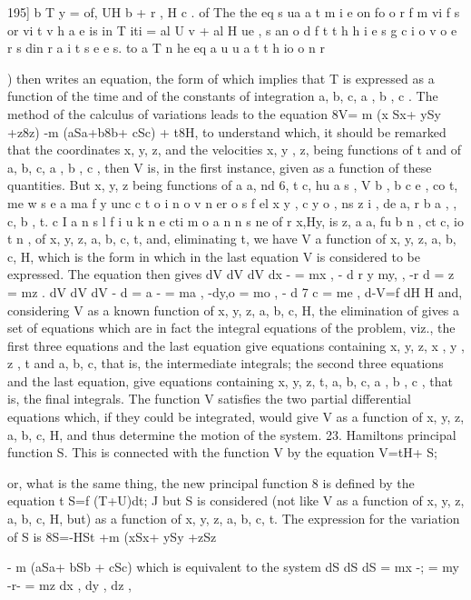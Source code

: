 \documentclass[11pt,a4paper]{book}
\begin{document}

195]
b T y = of, UH b + r , H c . of The the eq s ua a t m i e on fo o r f m vi f s or vi t v h a e is in T iti = al U v + al H ue , s an o d f t t h h i e s g c i o v o e r s din r a i t s e e s. to a T n he eq a u u a t t h io o n r
{)
then writes
an equation, the form of which implies that T is expressed as a function of the time
and of the constants of integration a, b, c, a , b , c . The method of the calculus of
variations leads to the equation
8V= m
(x
Sx+
ySy
+z8z) -m (aSa+b8b+
cSc)
+
t8H,
to understand which, it should be remarked that the coordinates x, y, z, and the
velocities x, y , z, being functions of t and of a, b, c, a , b , c , then V is, in the
first instance, given as a function of these quantities. But x, y, z being functions of
a a, nd 6, t c, hu a s , V b , b c e , co t, me w s e a ma f y unc c t o i n o v n er o s f el x y , c y o , ns z i , de a, r b a , , c, b , t. c I a n s l f i u k n e cti m o a n n s ne of r x,Hy, is z, a a, fu b n , ct c, io t n ,
of x, y, z, a, b, c, t, and, eliminating t, we have V a function of x, y, z, a, b, c, H, which
is the form in which in the last equation V is considered to be expressed. The equation
then gives
dV dV dV
dx - = mx , - d r y my, , -r d = z = mz .
dV dV dV
- d = a - = ma , -dy,o = mo , - d 7 c = me ,
d-V=f
dH
H
and, considering V as a known function of x, y, z, a, b, c, H, the elimination of
gives a set of equations which are in fact the integral equations of the problem,
viz., the first three equations and the last equation give equations containing
x, y, z, x , y , z , t and a, b, c, that is, the intermediate integrals; the second three
equations and the last equation, give equations containing x, y, z, t, a, b, c, a , b , c ,
that is, the final integrals.
The function V satisfies the two partial differential equations
which, if they could be integrated, would give V as a function of x, y, z, a, b, c, H,
and thus determine the motion of the system.
23. Hamiltons principal function S. This is connected with the function V by
the equation
V=tH+
S;



or, what is the same thing, the new principal function 8 is defined by the equation
t
S=f (T+U)dt;
J
but S is considered (not like V as a function of x, y, z, a, b, c, H, but) as a
function of x, y, z, a, b, c, t. The expression for the variation of S is
8S=-HSt +m (xSx+ ySy +zSz} - m (aSa+ bSb + cSc)
which is equivalent to the system
dS dS dS
= mx -; = my -r- = mz
dx , dy , dz ,
\end{document}
